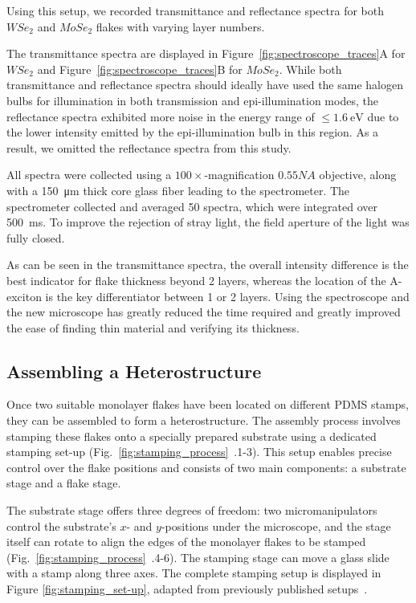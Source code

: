 \vspace{1cm}

Using this setup, we recorded transmittance and reflectance spectra for both $WSe_2$ and $MoSe_2$ flakes with varying layer numbers.



The transmittance spectra are displayed in Figure~\ref{fig:spectroscope_traces}A for $WSe_2$ and Figure~\ref{fig:spectroscope_traces}B for $MoSe_2$. 
%
While both transmittance and reflectance spectra should ideally have used the same halogen bulbs for illumination in both transmission and epi-illumination modes, the reflectance spectra exhibited more noise in the energy range of $\leq \SI{1.6}{\electronvolt}$ due to the lower intensity emitted by the epi-illumination bulb in this region. As a result, we omitted the reflectance spectra from this study.

All spectra were collected using a $100\times$-magnification $0.55NA$ objective, along with a \SI{150}{\micro\meter} thick core glass fiber leading to the spectrometer. 
%
The spectrometer collected and averaged 50 spectra, which were integrated over \SI{500}{\milli\second}. To improve the rejection of stray light, the field aperture of the light was fully closed.

As can be seen in the transmittance spectra, the overall intensity difference is the best indicator for flake thickness beyond 2 layers, whereas the location of the A-exciton is the key differentiator between 1 or 2 layers. 
%
Using the spectroscope and the new microscope has greatly reduced the time required and greatly improved the ease of finding thin material and verifying its thickness.

\subsection{Assembling a Heterostructure}
%
Once two suitable monolayer flakes have been located on different PDMS stamps, they can be assembled to form a heterostructure.
%
The assembly process involves stamping these flakes onto a specially prepared substrate using a dedicated stamping set-up (Fig.~\ref{fig:stamping_process}~.1-3).
%
This setup enables precise control over the flake positions and consists of two main components: a substrate stage and a flake stage.

The substrate stage offers three degrees of freedom: two micromanipulators control the substrate's $x$- and $y$-positions under the microscope, and the stage itself can rotate to align the edges of the monolayer flakes to be stamped (Fig.~\ref{fig:stamping_process}~.4-6).
%
The stamping stage can move a glass slide with a stamp along three axes.
%
The complete stamping setup is displayed in Figure \ref{fig:stamping_set-up}, adapted  from previously published setups~\cite{castellanos-gomezDeterministicTransferTwodimensional2014, castellanos-gomezDeterministicTransferTwodimensional2014a}.

